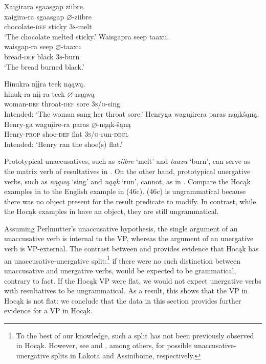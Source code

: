 \documentclass[output=paper]{LSP/langsci}
\begin{document}
\begin{exe}
\ex
\begin{xlist}
\ex 
\glll Xaigirara			sgaasgap		ziibre.\\
xaigira-ra			sgaasgap		$\varnothing$-ziibre \\
	chocolate-\textsc{def}	sticky			\textsc{3s}-melt \\
\trans `The chocolate melted sticky.'
\ex 
\glll Waisgapra		seep		taaxu.\\
waisgap-ra		seep		$\varnothing$-taaxu \\
	bread-\textsc{def}		black		\textsc{3s}-burn \\
\trans `The bread burned black.'
\end{xlist}
\end{exe}
\begin{exe}
\ex
\begin{xlist}
\ex 
\glll *Hinukra			n\k{i}\k{i}ra				teek	nąąwą.\\
hinuk-ra			n\k{i}\k{i}-ra				teek	$\varnothing$-nąąwą \\
		woman-\textsc{def}	 throat-\textsc{def}	sore	\textsc{3s/o}-sing \\
\trans Intended: `The woman sang her throat sore.'
\ex 
\glll *Henryga			wagu\k{i}irera		paras		nąąk\v{s}ąną.\\
Henry-ga		wagu\k{i}ire-ra	paras		$\varnothing$-nąąk-\v{s}ąną \\
		Henry-\textsc{prop}	shoe-\textsc{def}			flat			\textsc{3s/o}-run-\textsc{decl} \\
\trans Intended: `Henry ran the shoe(s) flat.'
\end{xlist}
\end{exe}

Prototypical unaccusatives, such as \textit{ziibre} `melt' and \textit{taaxu} `burn', can serve as the matrix verb of resultatives in . On the other hand, prototypical unergative verbs, such as \textit{nąąwą} `sing' and \textit{nąąk} `run', cannot, as in . Compare the Hocąk examples in  to the English example in (46c). (46c) is ungrammatical because there was no object present for the result predicate to modify. In contrast, while the Hocąk examples in  have an object, they are still ungrammatical.
	
Assuming Perlmutter's  unaccusative hypothesis, the single argument of an unaccusative verb is internal to the VP, whereas the argument of an unergative verb is VP-external. The contrast between  and  provides evidence that Hocąk has an unaccusative-unergative split:\footnote{To the best of our knowledge, such a split has not been previously observed in Hocąk. However, see \citet{Williamson1984} and \citet{West2003}, among others, for possible unaccusative-unergative splits in Lakota and Assiniboine, respectively.}  if there were no such distinction between unaccusative and unergative verbs,  would be expected to be grammatical, contrary to fact. If the Hocąk VP were flat, we would not expect unergative verbs with resultatives to be ungrammatical. As a result, this shows that the VP in Hocąk is not flat: we conclude that the data in this section provides further evidence for a VP in Hocąk.
\end{document}
